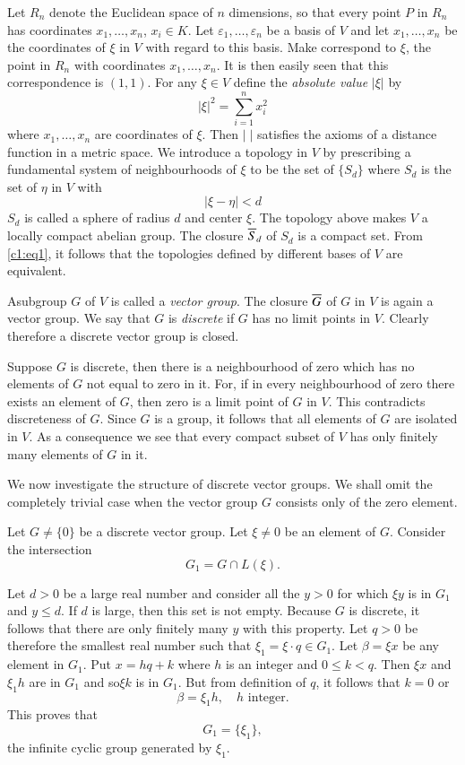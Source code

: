 Let $R_{n}$ denote the Euclidean space of $n$ dimensions, so that
every point $P$ in $R_{n}$ has coordinates $x_{1},\ldots,x_{n}$,
$x_{i}\in K$. Let $\varepsilon_{1},\ldots,\varepsilon_{n}$ be a basis of $V$
and let $x_{1},\ldots,x_{n}$ be the coordinates of $\xi$ in $V$ with
regard to this basis. Make correspond to $\xi$, the point in $R_{n}$
with coordinates $x_{1},\ldots,x_{n}$. It is then easily seen that
this correspondence is $(1,1)$. For any $\xi\in V$ define the {\em
  absolute value} $|\xi|$ by
$$
|\xi|^{2}=\sum^{n}_{i=1}x^{2}_{i}
$$
where $x_{1},\ldots,x_{n}$ are coordinates of $\xi$. Then $|\;|$
satisfies the axioms of a distance function in a metric space. We
introduce a topology in $V$ by prescribing a fundamental system of
neighbourhoods of $\xi$ to be the set of $\{S_{d}\}$ where $S_{d}$ is
the set of $\eta$ in $V$ with 
\begin{equation*}
|\xi-\eta|<d\tag{2}\label{c1:eq2}
\end{equation*}
$S_{d}$ is called a sphere of radius $d$ and center $\xi$. The
topology above makes $V$ a locally compact abelian group. The closure
$\overline{S}_{d}$ of $S_{d}$ is a compact set. From \eqref{c1:eq1}, it follows that
the topologies defined by different bases of $V$ are equivalent. 

A\pageoriginale subgroup $G$ of $V$ is called a {\em vector
  group}. The closure $\overline{G}$ of $G$ in $V$ is again a vector
group. We say that $G$ is {\em discrete} if $G$ has no limit points in
$V$. Clearly therefore a discrete vector group is closed.

Suppose $G$ is discrete, then there is a neighbourhood of zero which
has no elements of $G$ not equal to zero in it. For, if in every
neighbourhood of zero there exists an element of $G$, then zero is a
limit point of $G$ in $V$. This contradicts discreteness of $G$. Since
$G$ is a group, it follows that all elements of $G$ are isolated in
$V$. As a consequence we see that every compact subset of $V$ has only
finitely many elements of $G$ in it.

We now investigate the structure of discrete vector groups. We shall
omit the completely trivial case when the vector group $G$ consists
only of the zero element.

Let $G\neq \{0\}$ be a discrete vector group. Let $\xi\neq 0$ be an
element of $G$. Consider the intersection
$$
G_{1}=G\cap L(\xi).
$$

Let $d>0$ be a large real number and consider all the $y>0$ for which
$\xi y$ is in $G_{1}$ and $y\leqslant d$. If $d$ is large, then this
set is not empty. Because $G$ is discrete, it follows that there are
only finitely many $y$ with this property. Let $q>0$ be therefore the
smallest real number such that $\xi_{1}=\xi\cdot q\in G_{1}$. Let
$\beta=\xi x$ be any element in $G_{1}$. Put $x=hq+k$ where $h$ is an
integer and $0\leqslant k<q$. Then $\xi x$ and $\xi_{1}h$ are in
$G_{1}$ and so\pageoriginale $\xi k$ is in $G_{1}$. But from
definition of $q$, it follows that $k=0$ or
$$
\beta=\xi_{1}h,\quad h\text{ integer}.
$$
This proves that
$$
G_{1}=\{\xi_{1}\},
$$
the infinite cyclic group generated by $\xi_{1}$.

